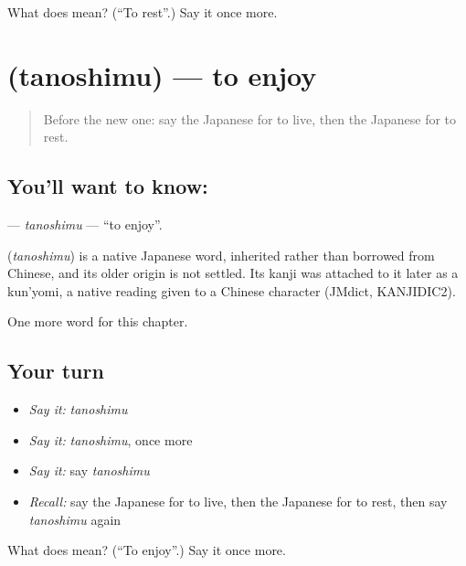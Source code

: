 \begin{tcolorbox}[breakable,colback=teal!4,colframe=teal!35!black,title={Before you move on}]
What does  mean? (\textquotedblleft{}To rest\textquotedblright{}.) Say it once more.
\end{tcolorbox}
\section[\texorpdfstring{\ja{たのしむ} (tanoshimu)}{たのしむ (tanoshimu)}]{ (tanoshimu) — to enjoy}

\label{lesson:JA-C29-tanoshimu}



\begin{quote}
Before the new one: say the Japanese for to live, then the Japanese for to rest.
\end{quote}

\subsection*{You'll want to know: }
\textbf{} — \emph{tanoshimu} — \textquotedblleft{}to enjoy\textquotedblright{}.

\begin{cousinweb}
\textbf{} (\emph{tanoshimu}) is a native Japanese word, inherited rather than borrowed from Chinese, and its older origin is not settled. Its kanji was attached to it later as a kun'yomi, a native reading given to a Chinese character (JMdict, KANJIDIC2).
\end{cousinweb}

\begin{grammarlens}[title={What you've built}]
One more word for this chapter.
\end{grammarlens}

\subsection*{Your turn}
\begin{itemize}
\raggedright
  \item \emph{Say it:} \emph{tanoshimu}
  \item \emph{Say it:} \emph{tanoshimu}, once more
  \item \emph{Say it:} say \emph{tanoshimu}
  \item \emph{Recall:} say the Japanese for to live, then the Japanese for to rest, then say \emph{tanoshimu} again
\end{itemize}

\begin{tcolorbox}[breakable,colback=teal!4,colframe=teal!35!black,title={Before you move on}]
What does  mean? (\textquotedblleft{}To enjoy\textquotedblright{}.) Say it once more.
\end{tcolorbox}

